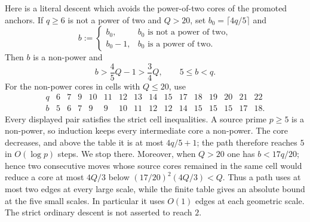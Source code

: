\documentclass[11pt]{article}
\numberwithin{equation}{section}
\theoremstyle{definition}
\theoremstyle{remark}
\newcommand{\1}{\mathbf 1}
\begin{document}
Here is a literal descent which avoids the power-of-two cores of the
promoted anchors.  If \(q\ge6\) is not a power of two and \(Q>20\), set
\(b_0=\lceil4q/5\rceil\) and
\begin{equation}
 b:=\begin{cases}
       b_0,&b_0\text{ is not a power of two},\\
       b_0-1,&b_0\text{ is a power of two}.
    \end{cases}
 \label{eq:bank-large-core-descent}
\end{equation}
Then \(b\) is a non-power and
\[
                  b>\frac45Q-1>\frac34Q,\qquad 5\le b<q.
\]
For the non-power cores in cells with \(Q\le20\), use
\begin{equation}
\begin{array}{c|rrrrrrrrrrrrrrr}
q&6&7&9&10&11&12&13&14&15&17&18&19&20&21&22\\ \hline
b&5&6&7&9&9&10&11&12&12&14&15&15&15&17&18.
\end{array}
\label{eq:bank-finite-descent-table}
\end{equation}
Every displayed pair satisfies the strict cell inequalities.  A source
prime \(p\ge5\) is a non-power, so induction keeps every intermediate core
a non-power.  The core decreases, and above the table it is at most
\(4q/5+1\); the path therefore reaches \(5\) in \(O(\log p)\) steps.  We
stop there.  Moreover, when \(Q>20\) one has
\(b<17q/20\); hence two consecutive moves whose source cores remained in
the same cell would reduce a core at most \(4Q/3\) below
\((17/20)^2(4Q/3)<Q\).  Thus a path uses at most two edges at every
large scale, while the finite table gives an absolute bound at the five
small scales.  In particular it uses \(O(1)\) edges at each geometric
scale.  The strict ordinary descent is not asserted to reach \(2\).
\end{document}
